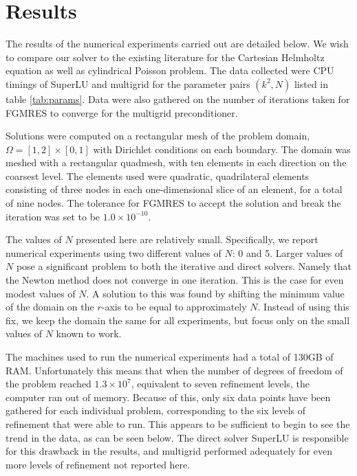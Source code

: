 \chapter{Results}

\def\figwidth{0.7\columnwidth}

\def \mgcol {red}
\def \lucol {black}

\def \helmholtzfolder {data/output_k_100_n_5}
\def \poissonfolder {data/output_k_0_n_5}
\def \axisymmpoisson {data/output_k_0_n_0}
\def \axisymhelmholtz {data/output_k_10_n_0}



The results of the numerical experiments carried out are detailed below.
We wish to compare our solver to the existing literature for the Cartesian Helmholtz equation as well as cylindrical Poisson problem.
The data collected were CPU timings of SuperLU and multigrid for the parameter pairs $(k^2,N)$ listed in table \ref{tab:params}.
Data were also gathered on the number of iterations taken for FGMRES to converge for the multigrid preconditioner.

Solutions were computed on a rectangular mesh of the problem domain, $\Omega = [1,2] \times [0,1]$ with Dirichlet conditions on each boundary.
The domain was meshed with a rectangular quadmesh, with ten elements in each direction on the coarsest level.
The elements used were quadratic, quadrilateral elements consisting of three nodes in each one-dimensional slice of an element, for a total of nine nodes.
The tolerance for FGMRES to accept the solution and break the iteration was set to be $1.0\times 10^{-10}$.

The values of $N$ presented here are relatively small.
Specifically, we report numerical experiments using two different values of $N$: 0 and 5.
Larger values of $N$ pose a significant problem to both the iterative and direct solvers.
Namely that the Newton method does not converge in one iteration.
This is the case for even modest values of $N$.
A solution to this was found by shifting the minimum value of the domain on the $r$-axis to be equal to approximately $N$.
Instead of using this fix, we keep the domain the same for all experiments, but focus only on the small values of $N$ known to work.

The machines used to run the numerical experiments had a total of 130GB of RAM.
Unfortunately this means that when the number of degrees of freedom of the problem reached $1.3\times 10^7$, equivalent to seven refinement levels, the computer ran out of memory.
Because of this, only six data points have been gathered for each individual problem, corresponding to the six levels of refinement that were able to run.
This appears to be sufficient to begin to see the trend in the data, as can be seen below.
The direct solver SuperLU is responsible for this drawback in the results, and multigrid performed adequately for even more levels of refinement not reported here.


